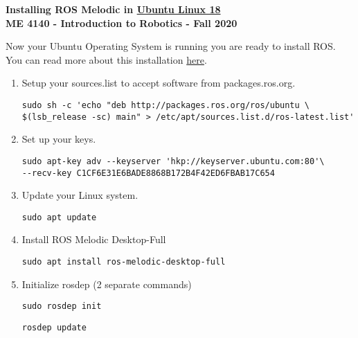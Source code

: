 \documentclass[12pt]{article}
\begin{document}
\thispagestyle{plain}

\begin{center}
	   {\bf \Large Installing ROS Melodic in {\underline{\LARGE Ubuntu Linux 18}}}\vspace{5mm} \\
   {\bf \large ME 4140 - Introduction to Robotics - Fall 2020} \vspace{2mm}\\
\end{center}



		{ Now your Ubuntu Operating System is running you are ready to install ROS. You can read more about this installation \href{http://wiki.ros.org/melodic/Installation/Ubuntu}{here}.}

\begin{enumerate}
	
	
	\item  Setup your sources.list to accept software from packages.ros.org.


	\begin{verbatim}
sudo sh -c 'echo "deb http://packages.ros.org/ros/ubuntu \
$(lsb_release -sc) main" > /etc/apt/sources.list.d/ros-latest.list'
	\end{verbatim}
	
	\item Set up your keys. 
	
	\begin{verbatim}
sudo apt-key adv --keyserver 'hkp://keyserver.ubuntu.com:80'\
--recv-key C1CF6E31E6BADE8868B172B4F42ED6FBAB17C654	
	\end{verbatim}			
	
	\item Update your Linux system. 
	
	\begin{verbatim}
sudo apt update
	\end{verbatim}	
	
	\item Install ROS Melodic Desktop-Full 
	\begin{verbatim}
sudo apt install ros-melodic-desktop-full
	\end{verbatim}
	
	\item Initialize rosdep (2 separate commands) 
	\begin{verbatim}
sudo rosdep init
	\end{verbatim}
	\begin{verbatim} 
rosdep update
	\end{verbatim}


\end{enumerate}
\end{document}
